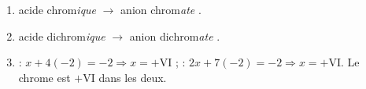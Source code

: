 \documentclass[11pt,a4paper]{article}
\begin{document}
\begin{corrige}
\begin{enumerate}[label=\alph*)]
  \item acide chrom\emph{ique} $\to$ anion chrom\emph{ate} .
  \item acide dichrom\emph{ique} $\to$ anion dichrom\emph{ate} .
  \item {} : $x+4(-2)=-2 \Rightarrow x=+\mathrm{VI}$ ;\quad
         : $2x+7(-2)=-2 \Rightarrow x=+\mathrm{VI}$. Le chrome est $+\mathrm{VI}$ dans les deux.
\end{enumerate}
\end{corrige}
\end{document}
